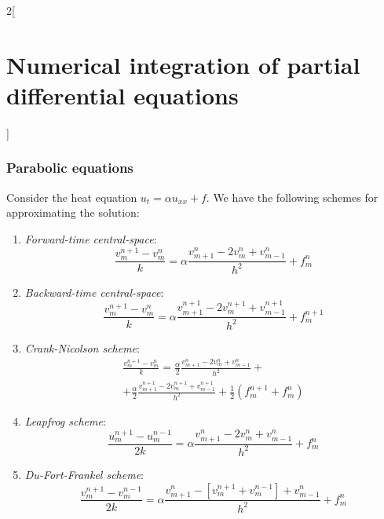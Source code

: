 \documentclass[../../../main_math.tex]{subfiles}
\begin{document}
\begin{multicols}{2}[\section{Numerical integration of partial differential equations}]
  \subsubsection{Parabolic equations}
  \begin{proposition}
    Consider the heat equation $u_t=\alpha u_{xx}+f$. We have the following schemes for approximating the solution:
    \begin{enumerate}
      \item \emph{Forward-time central-space}:
            $$\frac{v_m^{n+1}-v_m^n}{k}=\alpha\frac{v_{m+1}^n-2v_m^n+v_{m-1}^n}{h^2}+f_m^n$$
      \item \emph{Backward-time central-space}:
            $$\frac{v_m^{n+1}-v_m^n}{k}=\alpha\frac{v_{m+1}^{n+1}-2v_m^{n+1}+v_{m-1}^{n+1}}{h^2}+f_m^{n+1}$$
      \item \emph{Crank-Nicolson scheme}:
            \begin{multline*}
              \frac{v_m^{n+1}-v_m^n}{k}=\frac{\alpha}{2}\frac{v_{m+1}^n-2v_m^n+v_{m-1}^n}{h^2}+\\+\frac{\alpha}{2}\frac{v_{m+1}^{n+1}-2v_m^{n+1}+v_{m-1}^{n+1}}{h^2}+\frac{1}{2}(f_m^{n+1}+f_m^n)
            \end{multline*}
      \item \emph{Leapfrog scheme}:
            \begin{equation*}
              \frac{u_m^{n+1}-u_m^{n-1}}{2k}=\alpha\frac{v_{m+1}^n-2v_m^n+v_{m-1}^n}{h^2}+f_m^n
            \end{equation*}
      \item \emph{Du-Fort-Frankel scheme}:
            \begin{equation*}
              \frac{v_m^{n+1}-v_m^{n-1}}{2k}=\alpha\frac{v_{m+1}^{n}-[v_m^{n+1}\!+\!v_m^{n-1}]+v_{m-1}^{n}}{h^2}+f_m^{n}
            \end{equation*}
    \end{enumerate}
  \end{proposition}

\end{multicols}
\end{document}
